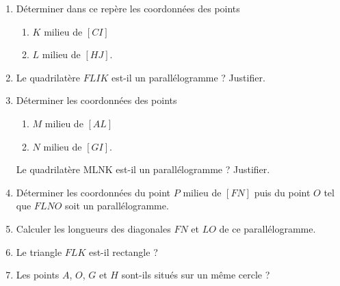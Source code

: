 \documentclass[a4paper,11pt,twocolumn,landscape]{article}
\begin{document}
\begin{minipage}{0.45\textwidth}
\begin{enumerate}
	\item Déterminer dans ce repère les coordonnées des points
	\begin{enumerate}
		\item $K$ milieu de $\left[CI\right]$
		\item $L$ milieu de $\left[HJ\right]$.
	\end{enumerate}

	\item Le quadrilatère $FLIK$ est-il un parallélogramme ? Justifier.

	\item Déterminer les coordonnées des points
	\begin{enumerate}
		\item $M$ milieu de $\left[AL\right]$
		\item $N$ milieu de $\left[GI\right]$.
	\end{enumerate}
	Le quadrilatère MLNK est-il un parallélogramme ? Justifier.
	\item Déterminer les coordonnées du point $P$ milieu de $\left[FN\right]$ puis du point $O$ tel que $FLNO$ soit un parallélogramme.
	\item Calculer les longueurs des diagonales $FN$ et $LO$ de ce parallélogramme.
	\item Le triangle $FLK$ est-il rectangle ?
	\item Les points $A$, $O$, $G$ et $H$ sont-ils situés sur un même cercle ?
\end{enumerate}

\vspace{-2em}


\end{minipage}
\newpage
\end{document}
